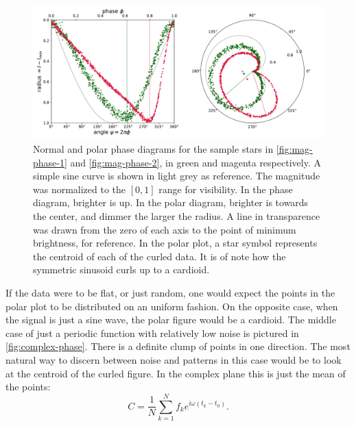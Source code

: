	\begin{figure}
		\centering
		\includegraphics[width=\textwidth]{img/complex_phase.pdf}
		\caption[Complex phase diagram: Fourier curl]{
			Normal and polar phase diagrams for the sample stars in \autoref{fig:mag-phase-1} and \ref{fig:mag-phase-2}, 
			in green and magenta respectively. A simple sine curve is shown in light grey as reference.
			The magnitude was normalized to the $[0,1]$ range for visibility. 
			In the phase diagram, brighter is up. In the polar diagram, brighter is towards the center, and dimmer the larger the radius.
			A line in transparence was drawn from the zero of each axis to the point of minimum brightness, for reference.
			In the polar plot, a star symbol represents the centroid of each of the curled data.
			It is of note how the symmetric sinusoid curls up to a cardioid.
		}
		\label{fig:complex-phase}
	\end{figure}
	
	If the data were to be flat, or just random, one would expect the points in the polar plot to be distributed on an uniform fashion.
	On the opposite case, when the signal is just a sine wave, the polar figure would be a cardioid. 
	The middle case of just a periodic function with relatively low noise is pictured in \autoref{fig:complex-phase}.
	There is a definite clump of points in one direction.
	The most natural way to discern between noise and patterns in this case would be to look at the centroid of the curled figure. 
	In the complex plane this is just the mean of the points:
	\begin{equation}
		C = \frac{1}{N}\sum_{k=1}^N f_k e^{i \omega (t_k-t_0)}. \label{eq:centroid}
	\end{equation}
	
